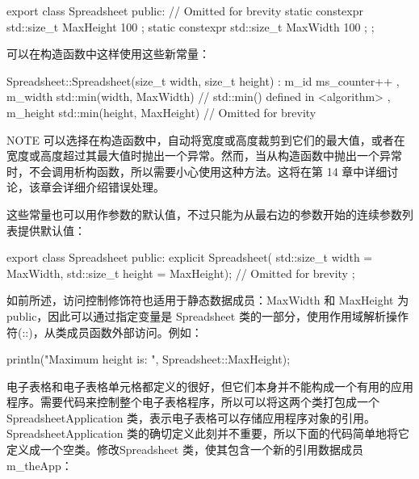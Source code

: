 \begin{cpp}
export class Spreadsheet
{
    public:
        // Omitted for brevity
        static constexpr std::size_t MaxHeight { 100 };
        static constexpr std::size_t MaxWidth { 100 };
};
\end{cpp}

可以在构造函数中这样使用这些新常量：

\begin{cpp}
Spreadsheet::Spreadsheet(size_t width, size_t height)
    : m_id { ms_counter++ }
    , m_width { std::min(width, MaxWidth) } // std::min() defined in <algorithm>
    , m_height { std::min(height, MaxHeight) }
{
    // Omitted for brevity
}
\end{cpp}

\begin{myNotic}{NOTE}
可以选择在构造函数中，自动将宽度或高度裁剪到它们的最大值，或者在宽度或高度超过其最大值时抛出一个异常。然而，当从构造函数中抛出一个异常时，不会调用析构函数，所以需要小心使用这种方法。这将在第 14 章中详细讨论，该章会详细介绍错误处理。
\end{myNotic}

这些常量也可以用作参数的默认值，不过只能为从最右边的参数开始的连续参数列表提供默认值：

\begin{cpp}
export class Spreadsheet
{
    public:
        explicit Spreadsheet(
            std::size_t width = MaxWidth, std::size_t height = MaxHeight);
        // Omitted for brevity
};
\end{cpp}


如前所述，访问控制修饰符也适用于静态数据成员：MaxWidth 和 MaxHeight 为public，因此可以通过指定变量是 Spreadsheet 类的一部分，使用作用域解析操作符(::)，从类成员函数外部访问。例如：

\begin{cpp}
println("Maximum height is: {}", Spreadsheet::MaxHeight);
\end{cpp}


电子表格和电子表格单元格都定义的很好，但它们本身并不能构成一个有用的应用程序。需要代码来控制整个电子表格程序，所以可以将这两个类打包成一个 SpreadsheetApplication 类，表示电子表格可以存储应用程序对象的引用。SpreadsheetApplication 类的确切定义此刻并不重要，所以下面的代码简单地将它定义成一个空类。修改Spreadsheet 类，使其包含一个新的引用数据成员 m\_theApp：

